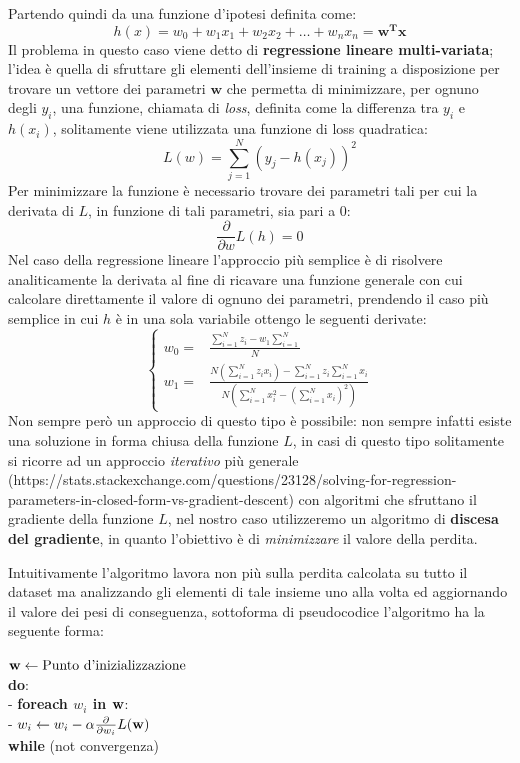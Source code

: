 \documentclass[../../main.tex]{subfiles}
\begin{document}
    Partendo quindi da una funzione d'ipotesi definita come:
    \[h(x) = w_0 + w_1x_1 + w_2x_2 + \dots + w_nx_n = \boldsymbol{w^T x}\]
    Il problema in questo caso viene detto di \textbf{regressione lineare multi-variata}; l'idea è quella di sfruttare gli elementi dell'insieme di training a disposizione per trovare un vettore dei parametri $\boldsymbol{w}$ che permetta di minimizzare, per ognuno degli $y_i$, una funzione, chiamata di \textit{loss}, definita come la differenza tra $y_i$ e $h(x_i)$, solitamente viene utilizzata una funzione di loss quadratica:
    \[L(w) = \sum_{j=1}^N(y_j - h(x_j))^2\]
    Per minimizzare la funzione è necessario trovare dei parametri tali per cui la derivata di $L$, in funzione di tali parametri, sia pari a 0:
    \[\frac{\partial}{\partial w} L(h) = 0\]
    Nel caso della regressione lineare l'approccio più semplice è di risolvere analiticamente la derivata al fine di ricavare una funzione generale con cui calcolare direttamente il valore di ognuno dei parametri, prendendo il caso più semplice in cui $h$ è in una sola variabile ottengo le seguenti derivate:
    \[
    \begin{cases}
        w_0 = & \frac{\sum_{i=1}^N z_i - w_1 \sum_{i=1}^N}{N}\\
        w_1 = & \frac{N(\sum_{i=1}^N z_ix_i) - \sum_{i=1}^N z_i \sum_{i=1}^N x_i}{N(\sum_{i=1}^N x_i^2 - (\sum_{i=1}^N x_i)^2)} 
    \end{cases}    
    \]
    Non sempre però un approccio di questo tipo è possibile: non sempre infatti esiste una soluzione in forma chiusa della funzione $L$, in casi di questo tipo solitamente si ricorre ad un approccio \textit{iterativo} più generale (https://stats.stackexchange.com/questions/23128/solving-for-regression-parameters-in-closed-form-vs-gradient-descent) con algoritmi che sfruttano il gradiente della funzione $L$, nel nostro caso utilizzeremo un algoritmo di \textbf{discesa del gradiente}, in quanto l'obiettivo è di \textit{minimizzare} il valore della perdita.

    Intuitivamente l'algoritmo lavora non più sulla perdita calcolata su tutto il dataset ma analizzando gli elementi di tale insieme uno alla volta ed aggiornando il valore dei pesi di conseguenza, sottoforma di pseudocodice l'algoritmo ha la seguente forma:

    $\bf{w} \leftarrow \text{Punto d'inizializzazione}$\\
    \textbf{do}:\\
    - \quad \textbf{foreach $w_i$ in $\bf{w}$}:\\
    - \quad \quad $w_i \leftarrow w_i - \alpha \frac{\partial}{\partial w_i} L(\bf{w})$\\
    \textbf{while} (not convergenza)
\end{document}
